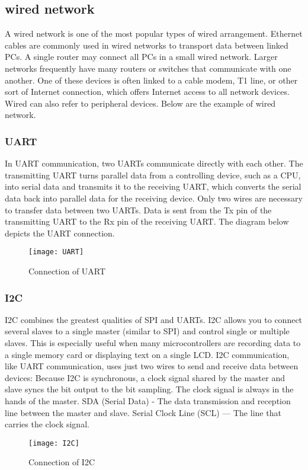 \subsection{wired network}
A wired network is one of the most popular types of wired arrangement. Ethernet cables are commonly used in wired networks to transport data between linked PCs. A single router may connect all PCs in a small wired network. Larger networks frequently have many routers or switches that communicate with one another. One of these devices is often linked to a cable modem, T1 line, or other sort of Internet connection, which offers Internet access to all network devices. Wired can also refer to peripheral devices. Below are the example of wired network.

\subsubsection{UART}
In UART communication, two UARTs communicate directly with each other. The transmitting UART turns parallel data from a controlling device, such as a CPU, into serial data and transmits it to the receiving UART, which converts the serial data back into parallel data for the receiving device. Only two wires are necessary to transfer data between two UARTs. Data is sent from the Tx pin of the transmitting UART to the Rx pin of the receiving UART. The diagram below depicts the UART connection. \cite{b4}

\begin{figure}[h]
    \centering
    \texttt{[image: UART]}
    \caption{Connection of UART}
    \label{fig:UART}
\end{figure}

\subsubsection{I2C}
I2C combines the greatest qualities of SPI and UARTs. I2C allows you to connect several slaves to a single master (similar to SPI) and control single or multiple slaves. This is especially useful when many microcontrollers are recording data to a single memory card or displaying text on a single LCD. I2C communication, like UART communication, uses just two wires to send and receive data between devices: Because I2C is synchronous, a clock signal shared by the master and slave syncs the bit output to the bit sampling. The clock signal is always in the hands of the master. SDA (Serial Data) - The data transmission and reception line between the master and slave. Serial Clock Line (SCL) — The line that carries the clock signal.\cite{b4}
\begin{figure}[h]
    \centering
    \texttt{[image: I2C]}
    \caption{Connection of I2C}
    \label{fig:I2C}
\end{figure}

